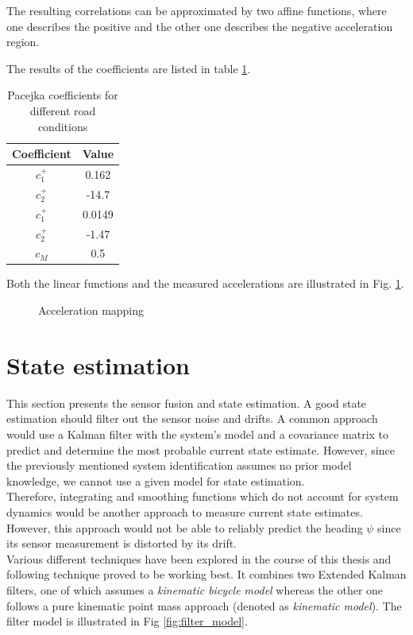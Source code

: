 The resulting correlations can be approximated by two affine functions, where one describes the positive and the other one describes the negative acceleration region.

The results of the coefficients are listed in table \ref{tab:v_mapping}.
\begin{table}[h!]
\centering
\caption{Pacejka coefficients for different road conditions}
\begin{tabular}{c|c}
Coefficient & Value\\
\hline
$c_1^+$ & 0.162\\
$c_2^+$ & -14.7\\
$c_1^+$ & 0.0149\\
$c_2^+$ & -1.47\\
$c_M$ & 0.5
\end{tabular}
\label{tab:v_mapping}
\end{table}

Both the linear functions and the measured accelerations are illustrated in Fig. \ref{fig:v_over_u}.

\begin{figure}[ht]
    \centering
      
    \caption{Acceleration mapping}
    \label{fig:v_over_u}
\end{figure}

\section{State estimation}\label{sec:stateEstimation}
This section presents the sensor fusion and state estimation. A good state estimation should filter out the sensor noise and drifts. A common approach would use a Kalman filter with the system's model and a covariance matrix to predict and determine the most probable current state estimate. However, since the previously mentioned system identification assumes no prior model knowledge, we cannot use a given model for state estimation.\\
Therefore, integrating and smoothing functions which do not account for system dynamics would be another approach to measure current state estimates. However, this approach would not be able to reliably predict the heading $\psi$ since its sensor measurement is distorted by its drift.\\
Various different techniques have been explored in the course of this thesis and following technique proved to be working best. It combines two Extended Kalman filters, one of which assumes a \emph{kinematic bicycle model} whereas the other one follows a pure kinematic point mass approach (denoted as \emph{kinematic model}). The filter model is illustrated in Fig \ref{fig:filter_model}.

